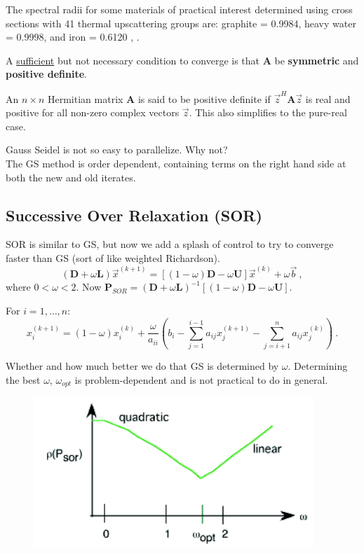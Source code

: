\documentclass[12pt]{article}
\newcommand{\ve}[1]{\ensuremath{\mathbf{#1}}}
\begin{document}
The spectral radii for some materials of practical interest determined using cross sections with 41 thermal upscattering groups are: graphite = 0.9984, heavy water = 0.9998, and iron = 0.6120 \cite{Adams2002}, \cite{Evans2009d}.

A \underline{sufficient} but not necessary condition to converge is that $\ve{A}$ be \textbf{symmetric} and \textbf{positive definite}.

An $n \times n$ Hermitian matrix $\ve{A}$ is said to be positive definite if $\vec{z}^H \ve{A} \vec{z}$ is real and positive for all non-zero complex vectors $\vec{z}$. This also simplifies to the pure-real case.

Gauss Seidel is not so easy to parallelize. Why not? \\The GS method is order dependent, containing terms on the right hand side at both the new and old iterates.


\subsection*{Successive Over Relaxation (SOR)}

SOR is similar to GS, but now we add a splash of control to try to converge faster than GS (sort of like weighted Richardson). 
%
\[(\ve{D} + \omega \ve{L})\vec{x}^{(k+1)} = [(1-\omega)\ve{D} - \omega \ve{U}] \vec{x}^{(k)} + \omega\vec{b}\:, \]
%
where $0 < \omega < 2$. Now $\ve{P}_{SOR} = (\ve{D} + \omega\ve{L})^{-1} [(1-\omega)\ve{D} - \omega \ve{U}]$. 

For $i = 1, \dots, n$:
\[ x^{(k+1)}_i = (1-\omega)x_i^{(k)} + \frac{\omega}{a_{ii}}(b_i - \sum_{j=1}^{i-1} a_{ij} x_j^{(k+1)} - \sum_{j=i+1}^{n} a_{ij} x_j^{(k)}) \:.\]

Whether and how much better we do that GS is determined by $\omega$.
Determining the best $\omega$, $\omega_{opt}$ is problem-dependent and is not practical to do in general.
%
\begin{figure}[h!]
\begin{center}
\includegraphics[height=2.25in]{SOR-omega}
\end{center}
\end{figure}
\end{document}
